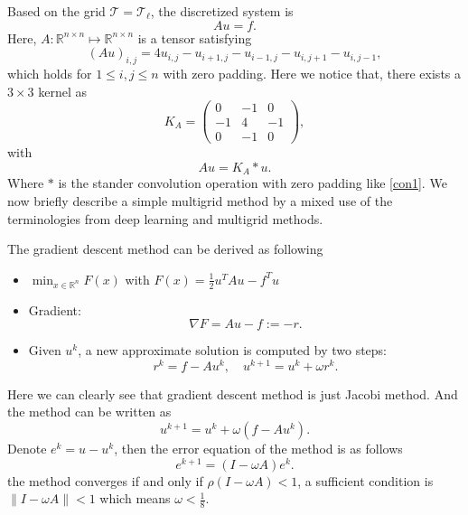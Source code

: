 Based on the grid $\mathcal T = \mathcal T_\ell$, the discretized system is
\begin{equation}
\label{laplace-h}
Au=f.
\end{equation}
Here,  $A:\mathbb R^{n\times n}\mapsto \mathbb R^{n\times n}$ is a tensor satisfying
\begin{equation}
\label{uniform-laplace}
(Au)_{i,j}=4u_{i,j}-u_{i+1,j}-u_{i-1,j}-u_{i,j+1}-u_{i,j-1},
\end{equation}
which holds for $1\le i,j \le n$ with zero padding. 
Here we notice that, there exists a $3\times 3$ kernel as
\begin{equation}\label{eq:kernel-A}
K_A = \begin{pmatrix}
0 & -1 & 0 \\
-1 & 4 & -1 \\
0 & -1 & 0
\end{pmatrix},
\end{equation}
with 
\begin{equation}\label{eq:convA}
Au = K_A \ast u.
\end{equation}
Where $\ast$ is the stander convolution operation with zero padding like \eqref{con1}. 
We now briefly describe a simple multigrid method by a mixed use of the terminologies from 
deep learning \cite{goodfellow2017deep} and multigrid methods.

The gradient descent method can be derived as following 
\begin{itemize}
	\item $\min_{x\in \mathbb{R}^n} F(x)$ with $ F(x) =
          \frac{1}{2}u^TA u - f^Tu$ 
	\item Gradient:
	$$
	\nabla F= Au - f := - r.
	$$
	\item Given $u^k$, a new approximate solution is computed by two steps:
	$$
	r^k = f-Au^k,\quad u^{k+1} = u^k + \omega r^k.
	$$
\end{itemize}
Here we can clearly see that gradient descent method is just Jacobi method.  
And the method can be written as 
$$
u^{k+1} = u^k + \omega (f-Au^k).
$$
Denote $e^k=u-u^k$, then the error equation of the method is as follows
$$
e^{k+1} = (I -\omega A)e^k.
$$
the method converges if and only if $\rho(I-\omega A)< 1$, a sufficient condition is $\|I-\omega A\|< 1$ which means $\omega<\frac{1}{8}$.

